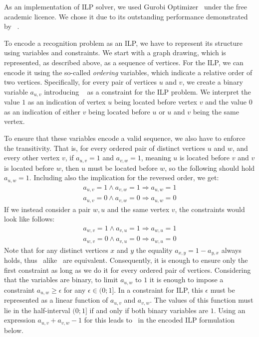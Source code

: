 As an implementation of ILP solver, we used Gurobi Optimizer~\cite{gurobi} under the free academic licence. We chose it due to its outstanding performance demonstrated by \citeauthor{Gurobi-performance}~\cite{Gurobi-performance}.

To encode a recognition problem as an ILP, we have to represent its structure using variables and constraints. We start with a graph drawing, which is represented, as described above, as a sequence of vertices. For the ILP, we can encode it using the so-called \emph{ordering} variables, which indicate a relative order of two vertices. Specifically, for every pair of vertices \(u\) and \(v\), we create a binary variable \(a_{u, v}\) introducing ~ as a constraint for the ILP problem. We interpret the value \(1\) as an indication of vertex \(u\) being located before vertex \(v\) and the value \(0\) as an indication of either \(v\) being located before \(u\) or \(u\) and \(v\) being the same vertex.

To ensure that these variables encode a valid sequence, we also have to enforce the transitivity. That is, for every ordered pair of distinct vertices \(u\) and \(w\), and every other vertex \(v\), if \(a_{u, v} = 1\) and \(a_{v, w} = 1\), meaning \(u\) is located before \(v\) and \(v\) is located before \(w\), then \(u\) must be located before \(w\), so the following should hold \(a_{u, w} = 1\). Including also the implication for the reversed order, we get:
\begin{align}
    a_{u, v} = 1 \land a_{v, w} = 1 \Longrightarrow a_{u, w} = 1 \label{eq:ilp:transitivity:uv:1}\\
    a_{u, v} = 0 \land a_{v, w} = 0 \Longrightarrow a_{u, w} = 0 \label{eq:ilp:transitivity:uv:0}
\end{align}
If we instead consider a pair \(w, u\) and the same vertex \(v\),  the constraints would look like follows:
\begin{align}
    a_{w, v} = 1 \land a_{v, u} = 1 \Longrightarrow a_{w, u} = 1 \label{eq:ilp:transitivity:vu:1} \\
    a_{w, v} = 0 \land a_{v, u} = 0 \Longrightarrow a_{w, u} = 0 \label{eq:ilp:transitivity:vu:0}
\end{align}
Note that for any distinct vertices \(x\) and \(y\) the equality \(a_{x, y} = 1 - a_{y, x}\) always holds, thus~ alike~ are equivalent. Consequently, it is enough to ensure only the first constraint as long as we do it for every ordered pair of vertices. Considering that the variables are binary, to limit \(a_{u, w}\) to \(1\) it is enough to impose a constraint \(a_{u, w} \geqslant \epsilon\) for any \(\epsilon \in (0;1]\). In a constraint for ILP, this \(\epsilon\) must be represented as a linear function of \(a_{u, v}\) and \(a_{v, w}\). The values of this function must lie in the half-interval \((0;1]\) if and only if both binary variables are \(1\). Using an expression \(a_{u, v} + a_{v, w} - 1\) for this leads to~ in the encoded ILP formulation below.

